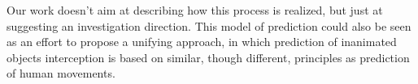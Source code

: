 Our work doesn't aim at describing how this process is realized, but just at suggesting an investigation direction.
This model of prediction could also be seen as an effort to propose a unifying approach, in which prediction of inanimated objects interception is based on similar, though different, principles as prediction of human movements. 






